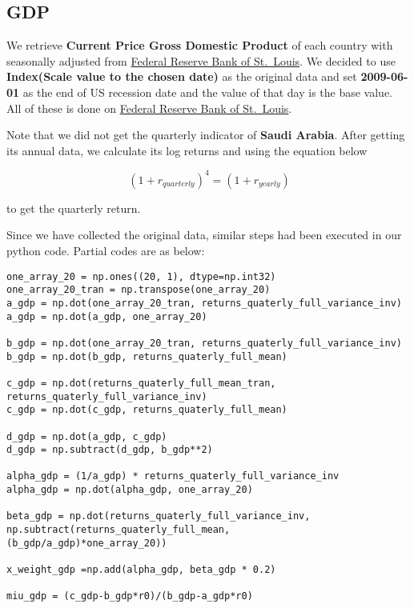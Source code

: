 \documentclass[
]{article}
\begin{document}
\hypertarget{gdp}{%
\subsection{GDP}\label{gdp}}

We retrieve \textbf{Current Price Gross Domestic Product} of each
country with seasonally adjusted from
\href{https://fred.stlouisfed.org/}{Federal Reserve Bank of St.~Louis}.
We decided to use \textbf{Index(Scale value to the chosen date)} as the
original data and set \textbf{2009-06-01} as the end of US recession
date and the value of that day is the base value. All of these is done
on \href{https://fred.stlouisfed.org/}{Federal Reserve Bank of
St.~Louis}.

Note that we did not get the quarterly indicator of \textbf{Saudi
Arabia}. After getting its annual data, we calculate its log returns and
using the equation below

\begin{equation}
\ (1+r_{quarterly})^4 = (1 + r_{yearly})
\end{equation}

to get the quarterly return.

Since we have collected the original data, similar steps had been
executed in our python code. Partial codes are as below:

\begin{verbatim}
one_array_20 = np.ones((20, 1), dtype=np.int32)
one_array_20_tran = np.transpose(one_array_20)
a_gdp = np.dot(one_array_20_tran, returns_quaterly_full_variance_inv)
a_gdp = np.dot(a_gdp, one_array_20)

b_gdp = np.dot(one_array_20_tran, returns_quaterly_full_variance_inv)
b_gdp = np.dot(b_gdp, returns_quaterly_full_mean)

c_gdp = np.dot(returns_quaterly_full_mean_tran, returns_quaterly_full_variance_inv)
c_gdp = np.dot(c_gdp, returns_quaterly_full_mean)

d_gdp = np.dot(a_gdp, c_gdp)
d_gdp = np.subtract(d_gdp, b_gdp**2)

alpha_gdp = (1/a_gdp) * returns_quaterly_full_variance_inv
alpha_gdp = np.dot(alpha_gdp, one_array_20)

beta_gdp = np.dot(returns_quaterly_full_variance_inv, np.subtract(returns_quaterly_full_mean, 
(b_gdp/a_gdp)*one_array_20))

x_weight_gdp =np.add(alpha_gdp, beta_gdp * 0.2)

miu_gdp = (c_gdp-b_gdp*r0)/(b_gdp-a_gdp*r0)
\end{verbatim}
\end{document}
